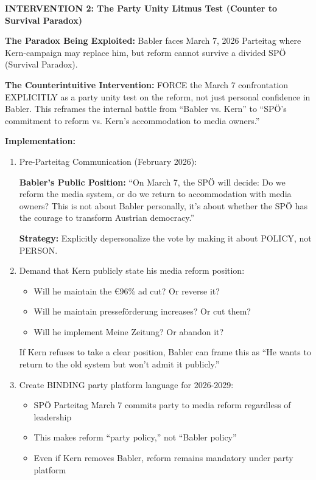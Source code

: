 \vspace{0.5cm}

\textbf{INTERVENTION 2: The Party Unity Litmus Test (Counter to Survival Paradox)}

\textbf{The Paradox Being Exploited:} Babler faces March 7, 2026 Parteitag where Kern-campaign may replace him,
but reform cannot survive a divided SPÖ (Survival Paradox).

\textbf{The Counterintuitive Intervention:} FORCE the March 7 confrontation EXPLICITLY as a party unity test on
the reform, not just personal confidence in Babler. This reframes the internal battle from ``Babler vs. Kern''
to ``SPÖ's commitment to reform vs. Kern's accommodation to media owners.''

\textbf{Implementation:}

\begin{enumerate}
\item Pre-Parteitag Communication (February 2026):

  \textbf{Babler's Public Position:} ``On March 7, the SPÖ will decide: Do we reform the media system,
  or do we return to accommodation with media owners? This is not about Babler personally, it's about
  whether the SPÖ has the courage to transform Austrian democracy.''

  \textbf{Strategy:} Explicitly depersonalize the vote by making it about POLICY, not PERSON.

\item Demand that Kern publicly state his media reform position:
  \begin{itemize}
  \item Will he maintain the €96\% ad cut? Or reverse it?
  \item Will he maintain presseförderung increases? Or cut them?
  \item Will he implement Meine Zeitung? Or abandon it?
  \end{itemize}

  If Kern refuses to take a clear position, Babler can frame this as ``He wants to return to the old system
  but won't admit it publicly.''

\item Create BINDING party platform language for 2026-2029:
  \begin{itemize}
  \item SPÖ Parteitag March 7 commits party to media reform regardless of leadership
  \item This makes reform ``party policy,'' not ``Babler policy''
  \item Even if Kern removes Babler, reform remains mandatory under party platform
  \end{itemize}


\end{enumerate}
